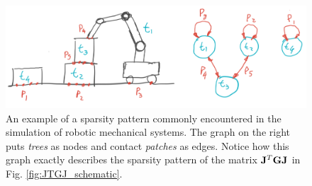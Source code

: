 \begin{figure}[!h]
	\centering
	\includegraphics[width=0.7\columnwidth]{figures/sparsity_example.png}
	\caption{\label{fig:sparsity_example} 
	An example of a sparsity pattern commonly encountered in the
	simulation of robotic mechanical systems. The graph on the right puts
	\textit{trees} as nodes and contact \textit{patches} as edges. Notice how
	this graph exactly describes the sparsity pattern of the matrix
	${\mathbf{J}}^T{\mathbf{G}}{\mathbf{J}}$ in Fig. \ref{fig:JTGJ_schematic}.}
\end{figure}


